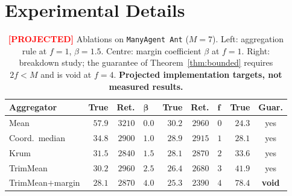 \documentclass{article}
\newcommand{\projected}{\textcolor{red}{\textbf{[PROJECTED]}}}
\begin{document}
\section{Experimental Details}
\label{app:exp}

\begin{table}[h]
\caption{\projected{} Ablations on \texttt{ManyAgent Ant} ($M=7$). Left: aggregation rule at $f{=}1$, $\beta{=}1.5$. Centre: margin coefficient $\beta$ at $f{=}1$. Right: breakdown study; the guarantee of Theorem~\ref{thm:bounded} requires $2f<M$ and is void at $f{=}4$. \textbf{Projected implementation targets, not measured results.}}
\label{tab:ablation}
\centering
\footnotesize
\begin{tabular}{@{}lrr@{\hskip 5mm}lrr@{\hskip 5mm}lrc@{}}
\toprule
\textbf{Aggregator} & \textbf{True} & \textbf{Ret.} & $\boldsymbol{\beta}$ & \textbf{True} & \textbf{Ret.} & $\boldsymbol{f}$ & \textbf{True} & \textbf{Guar.} \\
\midrule
Mean            & $57.9$ & $3210$ & $0.0$ & $30.2$ & $2960$ & $0$ & $24.3$ & yes \\
Coord.\ median  & $34.8$ & $2900$ & $1.0$ & $28.9$ & $2915$ & $1$ & $28.1$ & yes \\
Krum            & $31.5$ & $2840$ & $1.5$ & $28.1$ & $2870$ & $2$ & $33.6$ & yes \\
TrimMean        & $30.2$ & $2960$ & $2.5$ & $26.4$ & $2680$ & $3$ & $41.9$ & yes \\
TrimMean$+$margin & $28.1$ & $2870$ & $4.0$ & $25.3$ & $2390$ & $4$ & $78.4$ & \textbf{void} \\
\bottomrule
\end{tabular}
\end{table}
\end{document}

